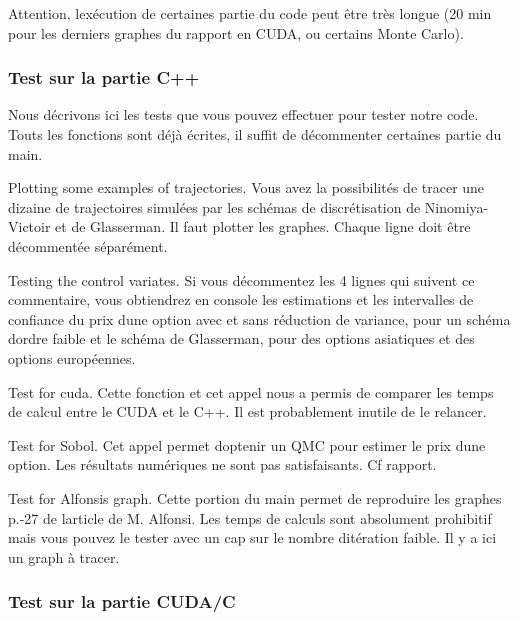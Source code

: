 Attention, l\textquotesingle{}exécution de certaines partie du code peut être très longue (20 min pour les derniers graphes du rapport en C\+U\+DA, ou certains Monte Carlo).

\subsubsection*{Test sur la partie C++}

Nous décrivons ici les tests que vous pouvez effectuer pour tester notre code. Touts les fonctions sont déjà écrites, il suffit de décommenter certaines partie du main.


\begin{DoxyItemize}
\item Plotting some examples of trajectories. Vous avez la possibilités de tracer une dizaine de trajectoires simulées par les schémas de discrétisation de Ninomiya-\/\+Victoir et de Glasserman. Il faut plotter les graphes. Chaque ligne doit être décommentée séparément.
\item Testing the control variates. Si vous décommentez les 4 lignes qui suivent ce commentaire, vous obtiendrez en console les estimations et les intervalles de confiance du prix d\textquotesingle{}une option avec et sans réduction de variance, pour un schéma d\textquotesingle{}ordre faible et le schéma de Glasserman, pour des options asiatiques et des options européennes.
\item Test for cuda. Cette fonction et cet appel nous a permis de comparer les temps de calcul entre le C\+U\+DA et le C++. Il est probablement inutile de le relancer.
\item Test for Sobol. Cet appel permet d\textquotesingle{}optenir un Q\+MC pour estimer le prix d\textquotesingle{}une option. Les résultats numériques ne sont pas satisfaisants. Cf rapport.
\item Test for Alfonsi\textquotesingle{}s graph. Cette portion du main permet de reproduire les graphes p.-\/27 de l\textquotesingle{}article de M. Alfonsi. Les temps de calculs sont absolument prohibitif mais vous pouvez le tester avec un cap sur le nombre d\textquotesingle{}itération faible. Il y a ici un graph à tracer.
\end{DoxyItemize}

\subsubsection*{Test sur la partie C\+U\+D\+A/C}

